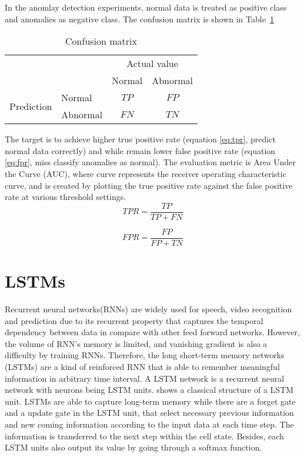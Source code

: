 In the anomlay detection experiments, normal data is treated as positive class and anomalies as negative class. The confusion matrix is shown in Table~\ref{tab:confusion}

\begin{table}[h]
\begin{center}
\begin{tabular}{l|l|c|c|}
\multicolumn{2}{c}{}&\multicolumn{2}{c}{Actual value}\\
\cline{3-4}
\multicolumn{2}{c|}{}&Normal&Abnormal\\
\cline{2-4}
\multirow{2}{*}{Prediction}& Normal & $TP$ & $FP$\\
\cline{2-4}
& Abnormal & $FN$ & $TN$\\
\cline{2-4}
\end{tabular}
\end{center}
\label{tab:confusion}
\caption{Confusion matrix}
\end{table}

The target is to achieve higher true positive rate (equation \ref{eq:tpr}, predict normal data correctly) and while remain lower false positive rate (equation \ref{eq:fpr}, miss classify anomalies as normal). The evaluation metric is Area Under the Curve (AUC), where curve represents the receiver operating characteristic curve, and is created by plotting the true positive rate against the false positive rate at various threshold settings.
\begin{equation} \label{eq:tpr}
TPR =\dfrac{TP}{TP+FN}
\end{equation}

\begin{equation} \label{eq:fpr}
FPR = \dfrac{FP}{FP+TN}
\end{equation}



\section{LSTMs}
\label{sec:LSTMs}

Recurrent neural networks(RNNs) are widely used for speech, video recognition and prediction due to its recurrent property that captures the temporal dependency between data in compare with other feed forward networks. However, the volume of RNN’s memory is limited, and vanishing gradient is also a difficulty by training RNNs. Therefore, the long short-term memory networks (LSTMs) are a kind of reinforced RNN that is able to remember meaningful information in arbitrary time interval. A LSTM network is a recurrent neural network with neurons being LSTM units.  shows a classical structure of a LSTM unit. LSTMs are able to capture long-term memory while there are a forget gate and a update gate in the LSTM unit, that select necessary previous information and new coming information according to the input data at each time step. The information is transferred to the next step within the cell state. Besides, each LSTM units also output its value by going through a softmax function.

